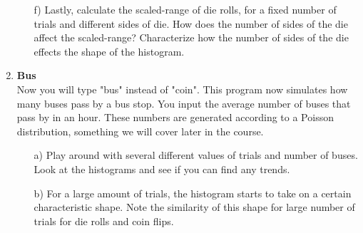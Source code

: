 \documentclass[11pt]{article}
\newif\ifsolutions
\begin{document}
\begin{enumerate}
\begin{enumerate}
\item[f)] Lastly, calculate the scaled-range of die rolls, for a fixed number of trials and different sides of die. How does the number of sides of the die affect the scaled-range? Characterize how the number of sides of the die effects the shape of the histogram.

\ifsolutions
{\color{blue}{Suggested values: $d=4,6$ and $n=8,t=100$; use the guide above in iv. and v., for a fixed number of trials, the scaled-range decreases as the number of sides increases.}}
\fi


\end{enumerate}




\item {\bf Bus}   \\
Now you will type "bus" instead of "coin". This program now simulates how many buses pass by a bus stop. You input the average number of buses that pass by in an hour. These numbers are generated according to a Poisson distribution, something we will cover later in the course.
\begin{enumerate}
\item[a)] Play around with several different values of trials and number of buses. Look at the histograms and see if you can find any trends.

\ifsolutions
{\color{blue}{Suggested test values: $t=10,100,1000, \lambda=4$; guide the student that the most common value is usually the number of buses, the spread also scales with that number. As with Poisson, $mean=var=\lambda$}}

\begin{figure}
\centering
\texttt{[image: resources/bus\_4\_1000.png]}
\caption{4 buses with 1000 trals.}
\end{figure}

\fi


\item[b)] For a large amount of trials, the histogram starts to take on a certain characteristic shape. Note the similarity of this shape for large number of trials for die rolls and coin flips.

\ifsolutions
{\color{blue}{Solution: (LLN) Normal distribution.}}
\fi

\end{enumerate}

   
\end{enumerate}
\end{document}
